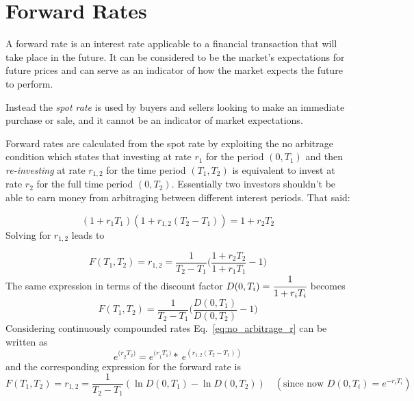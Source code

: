 \section{Forward Rates}\label{calculating-forward-rates}
A forward rate is an interest rate applicable to a financial transaction that will 
take place in the future. It can be considered to be the market's expectations for 
future prices and can serve as an indicator of how the market expects the future to perform.

Instead the \emph{spot rate} is used by buyers and sellers looking 
to make an immediate purchase or sale, and it cannot be an indicator of market 
expectations.

Forward rates are calculated from the spot rate by exploiting the no arbitrage condition which states that investing at rate \(r_1\) for the period \((0, T_1)\) and then \emph{re-investing} at rate \(r_{1,2}\) for the time period \((T_1, T_2)\) is equivalent to invest at rate \(r_2\) for the full time period \((0, T_2)\). Essentially two investors shouldn't be able to earn money from arbitraging between different interest periods. That said:

\begin{equation}
(1+r_1 T_1)(1+r_{1,2}(T_2 - T_1)) = 1 + r_2 T_2
\label{eq:no_arbitrage_r}
\end{equation}
Solving for \(r_{1,2}\) leads to

\begin{equation}
F(T_1, T_2) = r_{1,2} = \frac{1}{T_2 - T_1}\Big(\frac{1+r_2 T_2}{1+r_1 T_1} - 1 \Big)
\label{eq:forward_rate_simple}
\end{equation}
\vspace{0.5cm}
The same expression in terms of the discount factor $ D{(0, T_i)}=\cfrac{1}{1+r_iT_{i}}$ becomes
\begin{equation}
F(T_1, T_2) = \frac{1}{T_2 - T_1}\Big(\frac{D(0, T_1)}{D(0, T_2)} - 1 \Big)
\end{equation}
Considering continuously compounded rates Eq.~\ref{eq:no_arbitrage_r} can be
written as
\begin{equation*}
e^{{(r}_{2}T_{2})}=e^{{(r}_{1}T_{1})}\ast \ e^{\left(r_{1,2} \left(T_{2}-T_{1}\right)\right)}
\end{equation*}
and the corresponding expression for the forward rate is
\begin{equation}
F(T_1, T_2) = r_{1,2} = \frac {1}{T_{2}-T_{1}}(\ln D(0,T_{1})-\ln D(0,T_{2}))
\quad(\textrm{since now } D(0, T_i)=e^{-r_i T_i})
\label{eq:forward_rate_continous}
\end{equation}

